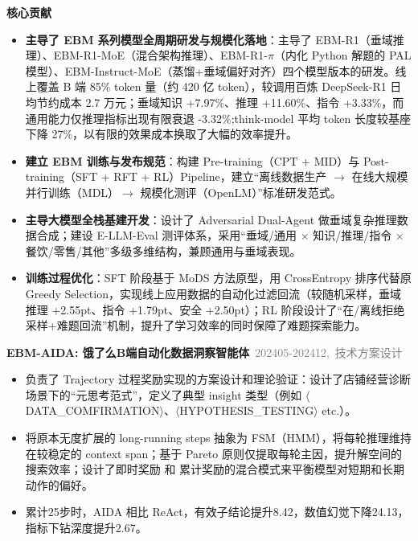 \documentclass{resume}
\newenvironment{graybox}{%
  \begin{mdframed}[backgroundcolor=lightgray,linewidth=0pt,innerleftmargin=8pt,innerrightmargin=8pt,innertopmargin=6pt,innerbottommargin=6pt]
}{%
  \end{mdframed}
}
\begin{document}
\begin{graybox}
\vspace{0.3em}
{\small\textbf{核心贡献}}
\begin{onehalfspacing}
\begin{itemize}
  \item \textbf{主导了 EBM 系列模型全周期研发与规模化落地}：主导了 EBM-R1（垂域推理）、EBM-R1-MoE（混合架构推理）、EBM-R1-$\pi$（内化 Python 解题的 PAL 模型）、EBM-Instruct-MoE（蒸馏+垂域偏好对齐）四个模型版本的研发。线上覆盖 B 端 85\% token 量（约 420 亿 token），较调用百炼 DeepSeek-R1 日均节约成本 2.7 万元；垂域知识 +7.97\%、推理 +11.60\%、指令 +3.33\%，而通用能力仅推理指标出现有限衰退 -3.32\%;think-model 平均 token 长度较基座下降 27\%，以有限的效果成本换取了大幅的效率提升。
  \item \textbf{建立 EBM 训练与发布规范}：构建 Pre-training（CPT + MID）与 Post-training（SFT + RFT + RL）Pipeline，建立“离线数据生产 $\rightarrow$ 在线大规模并行训练（MDL）$\rightarrow$ 规模化测评（OpenLM）”标准研发范式。
  \item \textbf{主导大模型全栈基建开发}：设计了 Adversarial Dual-Agent 做垂域复杂推理数据合成；建设 E-LLM-Eval 测评体系，采用“垂域/通用 $\times$ 知识/推理/指令 $\times$ 餐饮/零售/其他”多级多维结构，兼顾通用与垂域表现。
  \item \textbf{训练过程优化}：SFT 阶段基于 MoDS 方法原型，用 CrossEntropy 排序代替原 Greedy Selection，实现线上应用数据的自动化过滤回流（较随机采样，垂域推理 +2.55pt、指令 +1.79pt、安全 +2.50pt）；RL 阶段设计了“在/离线拒绝采样+难题回流”机制，提升了学习效率的同时保障了难题探索能力。
\end{itemize}
\end{onehalfspacing}

\vspace{0.3em}
\noindent{\color{gray!40}\rule{\textwidth}{0.2pt}}
\textbf{EBM-AIDA: 饿了么B端自动化数据洞察智能体}\ {\small\textcolor{gray}{\hfill 202405-202412,\ 技术方案设计}}
\begin{onehalfspacing}
\begin{itemize}
  \item 负责了 Trajectory 过程奖励实现的方案设计和理论验证：设计了店铺经营诊断场景下的“元思考范式”，定义了典型 insight 类型（例如 $\langle$DATA\_COMFIRMATION$\rangle$、$\langle$HYPOTHESIS\_TESTING$\rangle$ etc.）。
  \item 将原本无度扩展的 long-running steps 抽象为 FSM（HMM），将每轮推理维持在较稳定的 context span；基于 Pareto 原则仅提取每轮主因，提升解空间的搜索效率；设计了即时奖励 和 累计奖励的混合模式来平衡模型对短期和长期动作的偏好。
  \item 累计25步时，AIDA 相比 ReAct，有效子结论提升8.42，数值幻觉下降24.13，指标下钻深度提升2.67。
\end{itemize}
\end{onehalfspacing}


\end{graybox}
\end{document}
